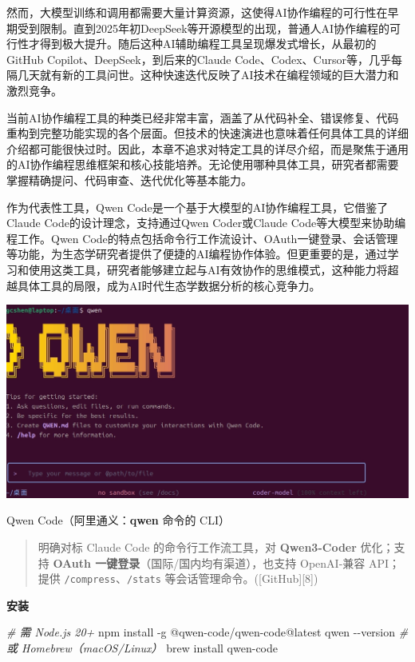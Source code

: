 \documentclass[
]{book}
\newenvironment{Shaded}{\begin{snugshade}}{\end{snugshade}}
\newcommand{\AttributeTok}[1]{\textcolor[rgb]{0.13,0.29,0.53}{#1}}
\newcommand{\CommentTok}[1]{\textcolor[rgb]{0.56,0.35,0.01}{\textit{#1}}}
\newcommand{\ExtensionTok}[1]{#1}
\newcommand{\NormalTok}[1]{#1}
\begin{document}
然而，大模型训练和调用都需要大量计算资源，这使得AI协作编程的可行性在早期受到限制。直到2025年初DeepSeek等开源模型的出现，普通人AI协作编程的可行性才得到极大提升。随后这种AI辅助编程工具呈现爆发式增长，从最初的GitHub Copilot、DeepSeek，到后来的Claude Code、Codex、Cursor等，几乎每隔几天就有新的工具问世。这种快速迭代反映了AI技术在编程领域的巨大潜力和激烈竞争。

当前AI协作编程工具的种类已经非常丰富，涵盖了从代码补全、错误修复、代码重构到完整功能实现的各个层面。但技术的快速演进也意味着任何具体工具的详细介绍都可能很快过时。因此，本章不追求对特定工具的详尽介绍，而是聚焦于通用的AI协作编程思维框架和核心技能培养。无论使用哪种具体工具，研究者都需要掌握精确提问、代码审查、迭代优化等基本能力。

作为代表性工具，Qwen Code是一个基于大模型的AI协作编程工具，它借鉴了Claude Code的设计理念，支持通过Qwen Coder或Claude Code等大模型来协助编程工作。Qwen Code的特点包括命令行工作流设计、OAuth一键登录、会话管理等功能，为生态学研究者提供了便捷的AI编程协作体验。但更重要的是，通过学习和使用这类工具，研究者能够建立起与AI有效协作的思维模式，这种能力将超越具体工具的局限，成为AI时代生态学数据分析的核心竞争力。

\includegraphics{imgs/qwen-code.jpg}

Qwen Code（阿里通义：\textbf{qwen} 命令的 CLI）

\begin{quote}
明确对标 Claude Code 的命令行工作流工具，对 \textbf{Qwen3-Coder} 优化；支持 \textbf{OAuth 一键登录}（国际/国内均有渠道），也支持 OpenAI-兼容 API；提供 \texttt{/compress}、\texttt{/stats} 等会话管理命令。({[}GitHub{]}{[}8{]})
\end{quote}

\textbf{安装}

\begin{Shaded}
\begin{Highlighting}[]
\CommentTok{\# 需 Node.js 20+}
\ExtensionTok{npm}\NormalTok{ install }\AttributeTok{{-}g}\NormalTok{ @qwen{-}code/qwen{-}code@latest}
\ExtensionTok{qwen} \AttributeTok{{-}{-}version}
\CommentTok{\# 或 Homebrew（macOS/Linux）}
\ExtensionTok{brew}\NormalTok{ install qwen{-}code}
\end{Highlighting}
\end{Shaded}
\end{document}
